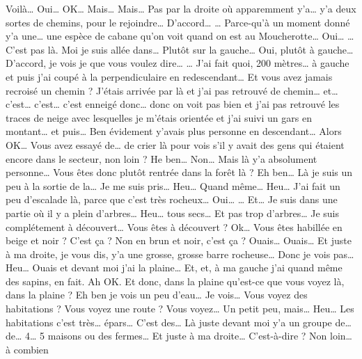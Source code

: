 \begin{dialogue*}
  \Req {} Voilà… Oui…
  \Sec OK…
  \Req Mais… Mais… Pas par la droite où apparemment y'a… y'a deux
  sortes de chemins, pour le rejoindre…
  \Sec {} D'accord…
  \Req … Parce-qu’à un moment donné y'a une… une espèce de cabane
  qu'on voit quand on est au Moucherotte…
  \Sec {} Oui…
  \Req … C'est pas là. Moi je suis allée dans… Plutôt sur la gauche…
  \Sec {} Oui, plutôt à gauche… D'accord,
  je vois je que vous voulez dire…
  \Req … J'ai fait quoi, 200 mètres… à gauche et puis j'ai coupé à la
  perpendiculaire en redescendant…
  \Sec {} Et vous avez jamais recroisé un
  chemin ?
  \Req J'étais arrivée par là et j'ai pas retrouvé de chemin… et…
  c'est… c'est… c'est enneigé donc… donc on voit pas bien et j'ai pas
  retrouvé les traces de neige avec lesquelles je m'étais orientée et
  j'ai suivi un gars en montant… et puis… Ben évidement y'avais plus
  personne en descendant…
  \Sec {} Alors OK… Vous avez essayé de… de
  crier là pour vois s'il y avait des gens qui étaient encore dans le
  secteur, non loin ?
  \Req He ben… Non… Mais là y'a absolument personne…
  \Sec {} Vous êtes donc plutôt rentrée dans
  la forêt là ?
  \Req Eh ben… Là je suis un peu à la sortie de la… Je me suis pris…
  Heu… Quand même… Heu… J'ai fait un peu d'escalade là, parce que
  c'est très rocheux…
  \Sec {} Oui…
  \Req … Et… Je suis dans une partie où il y a plein d'arbres… Heu…
  tous secs… Et pas trop d'arbres… Je suis complétement à découvert…
  \Sec {} Vous êtes à découvert ? Ok… Vous
  êtes habillée en beige et noir ? C'est ça ? Non en brun et noir,
  c'est ça ?
  \Req Ouais… Ouais… Et juste à ma droite, je vous dis, y'a une
  grosse, grosse barre rocheuse… Donc je vois pas… Heu… Ouais et
  devant moi j'ai la plaine… Et, et, à ma gauche j'ai quand même des
  sapins, en fait.
  \Sec Ah OK. Et donc, dans la plaine qu'est-ce que vous voyez là,
  dans la plaine ?
  \Req Eh ben je vois un peu d'eau… Je vois… 
  \Sec {} Vous voyez des habitations ? Vous
  voyez une route ? Vous voyez…
  \Req Un petit peu, mais… Heu… Les habitations c'est très… épars…
  C'est des… Là juste devant moi y'a un groupe de… de… 4… 5 maisons ou
  des fermes… Et juste à ma droite…
  \Sec {} C'est-à-dire ? Non loin… à combien

\end{dialogue*}
